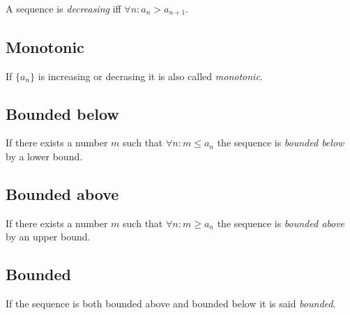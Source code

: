 \documentclass{article}
\begin{document}
A sequence is \textit{decreasing} iff \(\forall n:  a_n>a_{n+1}\).

\subsection{Monotonic}

If \(\{a_n\}\) is increasing or decrasing it is also called \textit{monotonic}.

\subsection{Bounded below}

If there exists a number \(m\) such that \(\forall n : m \leq a_n\)
the sequence is \textit{bounded below} by a lower bound.

\subsection{Bounded above}

If there exists a number \(m\) such that \(\forall n : m \geq a_n\)
the sequence is \textit{bounded above} by an upper bound.

\subsection{Bounded}

If the sequence is both bounded above and bounded below it is
said \textit{bounded}.

\pagebreak
\end{document}
